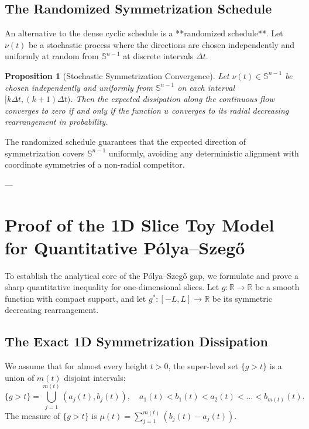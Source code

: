 \documentclass[11pt]{article}
\newtheorem{proposition}[theorem]{Proposition}
\theoremstyle{definition}
\newcommand{\R}{\mathbb R}
\newcommand{\Sph}{\mathbb S^{n-1}}
\begin{document}
\subsection{The Randomized Symmetrization Schedule}

An alternative to the dense cyclic schedule is a **randomized schedule**. Let $\nu(t)$ be a stochastic process where the directions are chosen independently and uniformly at random from $\Sph$ at discrete intervals $\Delta t$.

\begin{proposition}[Stochastic Symmetrization Convergence]\label{prop:stochastic}
Let $\nu(t) \in \Sph$ be chosen independently and uniformly from $\Sph$ on each interval $[k \Delta t, (k+1)\Delta t)$. Then the expected dissipation along the continuous flow converges to zero if and only if the function $u$ converges to its radial decreasing rearrangement in probability.
\end{proposition}

The randomized schedule guarantees that the expected direction of symmetrization covers $\Sph$ uniformly, avoiding any deterministic alignment with coordinate symmetries of a non-radial competitor.

---

\section{Proof of the 1D Slice Toy Model for Quantitative Pólya--Szegő}

To establish the analytical core of the Pólya--Szegő gap, we formulate and prove a sharp quantitative inequality for one-dimensional slices. Let $g : \R \to \R$ be a smooth function with compact support, and let $g^* : [-L, L] \to \R$ be its symmetric decreasing rearrangement.

\subsection{The Exact 1D Symmetrization Dissipation}

We assume that for almost every height $t > 0$, the super-level set $\{g > t\}$ is a union of $m(t)$ disjoint intervals:
\begin{equation}
\{g > t\} = \bigcup_{j=1}^{m(t)} (a_j(t), b_j(t)), \quad a_1(t) < b_1(t) < a_2(t) < \dots < b_{m(t)}(t).
\end{equation}
The measure of $\{g > t\}$ is $\mu(t) = \sum_{j=1}^{m(t)} (b_j(t) - a_j(t))$. 
\end{document}

